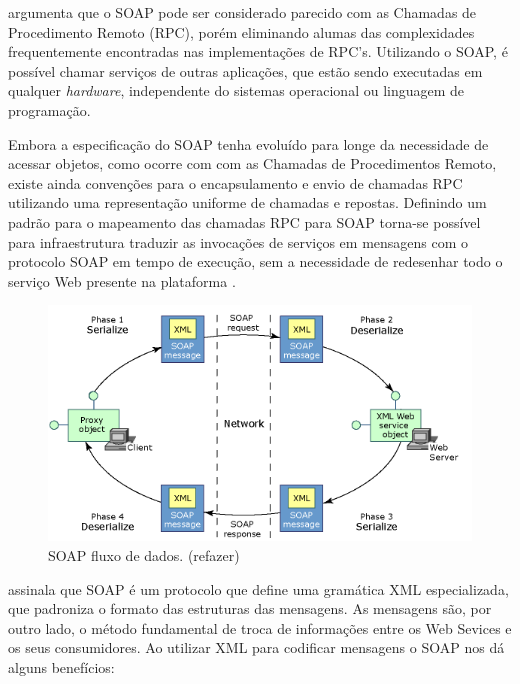  argumenta que o SOAP pode ser considerado parecido com as Chamadas de Procedimento Remoto (RPC), porém eliminando alumas das complexidades frequentemente encontradas nas implementações de RPC's. Utilizando o SOAP, é possível chamar serviços de outras aplicações, que estão sendo executadas em qualquer \textit{hardware}, independente do sistemas operacional ou linguagem de programação.

Embora a especificação do SOAP tenha evoluído para longe da necessidade de acessar objetos, como ocorre com com as Chamadas de Procedimentos Remoto, existe ainda convenções para o encapsulamento e envio de chamadas RPC utilizando uma representação uniforme de chamadas e repostas. Definindo um padrão para o mapeamento das chamadas RPC para SOAP torna-se possível para infraestrutura traduzir as invocações de serviços em mensagens com o protocolo SOAP em tempo de execução, sem a necessidade de redesenhar todo o serviço Web presente na plataforma \cite{soap-microsoft}.

\begin{figure}[htbp]
\centering
\includegraphics[width=1\textwidth]{figuras/soap-st.png}
\caption{SOAP fluxo de dados. (refazer)}
\label{fig:soap}
\author{https://msdn.microsoft.com/en-us/library/x05s00wz(v=vs.80).aspx}
\end{figure}


 assinala que SOAP é um protocolo que define uma gramática XML especializada, que padroniza o formato das estruturas das mensagens. As mensagens são, por outro lado, o método fundamental de troca de informações entre os Web Sevices e os seus consumidores. Ao utilizar XML para codificar mensagens o SOAP nos dá alguns benefícios:


